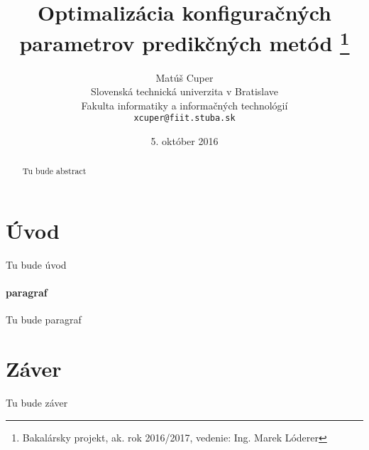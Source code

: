 \documentclass[10pt,twoside,slovak,a4paper]{article}
\title{Optimalizácia konfiguračných parametrov predikčných metód
\thanks{Bakalársky projekt, ak. rok 2016/2017,
vedenie: Ing. Marek Lóderer}}
\author{Matúš Cuper\\[2pt]
	{\small Slovenská technická univerzita v Bratislave}\\
	{\small Fakulta informatiky a informačných technológií}\\
	{\small \texttt{xcuper@fiit.stuba.sk}}
	}
\date{\small 5. október 2016}
\begin{document}
\maketitle


\begin{abstract}

Tu bude abstract

\end{abstract}


\section{Úvod}

Tu bude úvod

\paragraph{paragraf}
Tu bude paragraf




\section{Záver} \label{zaver}

Tu bude záver
\end{document}
